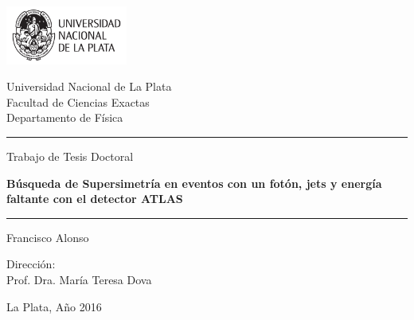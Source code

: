 \newcommand{\HRule}{\rule{\linewidth}{1pt}}

\begin{titlepage}

  \centering

  \includegraphics[width=0.30\textwidth]{figures/logo_unlp.pdf}


  \vspace{0.5cm}

  {
    \large \sc
    Universidad Nacional de La Plata \\[0.25cm]
    Facultad de Ciencias Exactas \\[0.25cm]
    Departamento de Física
  }

  \vspace{1.5cm}



  \HRule

  \vspace{0.2cm}

  {\large Trabajo de Tesis Doctoral}\\[0.5cm]

  \vspace{0.3cm}

  {
    \huge \bfseries Búsqueda de Supersimetría en eventos con un fotón,
    jets y energía faltante con el detector ATLAS\\[0.4cm]
  }

  \vspace{0.2cm}

  \HRule

  \vspace{1.5cm}

  \noindent
  Francisco Alonso

  \vspace{1cm}

  Dirección: \\
  Prof. Dra. María Teresa Dova

  \vfill

  {\large La Plata, Año 2016}

\end{titlepage}
